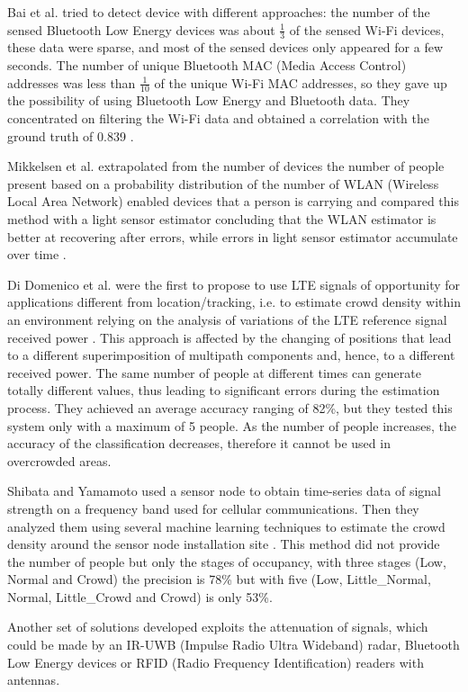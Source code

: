 Bai et al. tried to detect device with different approaches: the number of the sensed Bluetooth Low Energy devices was about $\frac{1}{3}$ of the sensed Wi-Fi devices, these data were sparse, and most of the sensed devices only appeared for a few seconds. The number of unique Bluetooth MAC (Media Access Control) addresses was less than $\frac{1}{10}$ of the unique Wi-Fi MAC addresses, so they gave up the possibility of using Bluetooth Low Energy and Bluetooth data. They concentrated on filtering the Wi-Fi data and obtained a correlation with the ground truth of 0.839 \cite{bai2017lessons}.

Mikkelsen et al. extrapolated from the number of devices the number of people present based on a probability distribution of the number of WLAN (Wireless Local Area Network) enabled devices that a person is carrying and compared this method with a light sensor estimator concluding that the WLAN estimator is better at recovering after errors, while errors in light sensor estimator accumulate over time \cite{mikkelsen2018sensing}.

Di Domenico et al. were the first to propose to use LTE signals of opportunity for applications different from location/tracking, i.e. to estimate crowd density within an environment relying on the analysis of variations of the LTE reference signal received power \cite{di2017lte}. This approach is affected by the changing of positions that lead to a different superimposition of multipath components and, hence, to a different received power. The same number of people at different times can generate totally different values, thus leading to significant errors during the estimation process. They achieved an average accuracy ranging of 82\%, but they tested this system only with a maximum of 5 people. As the number of people increases, the accuracy of the classification decreases, therefore it cannot be used in overcrowded areas.

Shibata and Yamamoto used a sensor node to obtain time-series data of signal strength on a frequency band used for cellular communications. Then they analyzed them using several machine learning techniques to estimate the crowd density around the sensor node installation site \cite{shibata2019people}. This method did not provide the number of people but only the stages of occupancy, with three stages (Low, Normal and Crowd) the precision is 78\% but with five (Low, Little\_Normal, Normal, Little\_Crowd and Crowd) is only 53\%. 

Another set of solutions developed exploits the attenuation of signals, which could be made by an IR-UWB (Impulse Radio Ultra Wideband) radar, Bluetooth Low Energy devices or RFID (Radio Frequency Identification) readers with antennas.

